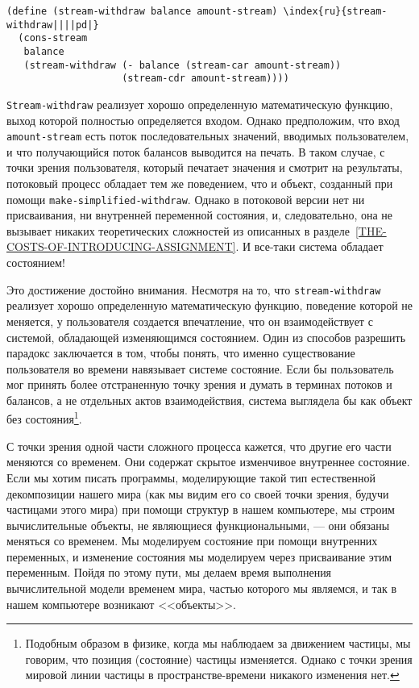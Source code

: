 \begin{Verbatim}[fontsize=\small]
(define (stream-withdraw balance amount-stream) \index{ru}{stream-withdraw||||pd|}
  (cons-stream
   balance
   (stream-withdraw (- balance (stream-car amount-stream))
                    (stream-cdr amount-stream))))
\end{Verbatim}

{\tt Stream-withdraw} реализует хорошо определенную
математическую фун\-кцию, выход которой полностью определяется входом.
Однако предположим, что вход {\tt amount-stream} есть поток
последовательных значений, вводимых пользователем, и что получающийся
поток балансов выводится на печать.  В таком случае, с точки зрения
пользователя, который печатает значения и смотрит на результаты,
потоковый процесс обладает тем же поведением, что и объект, созданный
при помощи {\tt make-simplified-withdraw}.  Однако в потоковой
версии нет ни присваивания, ни внутренней переменной состояния, и,
следовательно, она не вызывает никаких теоретических сложностей из
описанных в
разделе~\ref{THE-COSTS-OF-INTRODUCING-ASSIGNMENT}.  И все-таки
система обладает состоянием!

Это достижение достойно внимания.  Несмотря на то, что
{\tt stream-withdraw} реализует хорошо определенную
математическую функцию, поведение которой не меняется, у пользователя
создается впечатление, что он взаимодействует с системой, обладающей
изменяющимся состоянием.  Один из способов разрешить парадокс
заключается в том, чтобы понять, что именно существование пользователя
во времени навязывает системе состояние.  Если бы пользователь мог
принять более отстраненную точку зрения и думать в терминах потоков и
балансов, а не отдельных актов взаимодействия, система выглядела бы
как объект без состояния\footnote{Подобным образом в физике, когда мы наблюдаем за
движением частицы, мы говорим, что позиция (состояние) частицы
изменяется.  
Однако с точки зрения мировой линии частицы в
пространстве-времени никакого изменения нет.}.
{\sloppy

}

С точки зрения одной части сложного процесса кажется, что
другие его части меняются со временем.  Они содержат скрытое
изменчивое внутреннее состояние.  Если мы хотим писать программы,
моделирующие такой тип естественной декомпозиции нашего мира (как мы
видим его со своей точки зрения, будучи частицами этого мира) при помощи
структур в нашем компьютере, мы строим вычислительные объекты, не
являющиеся функциональными, --- они обязаны меняться со временем.  Мы
моделируем состояние при помощи внутренних переменных, и изменение
состояния мы моделируем через присваивание этим переменным.  Пойдя по
этому пути, мы делаем время выполнения вычислительной модели временем
мира, частью которого мы являемся, и так в нашем компьютере возникают
<<объекты>>.

